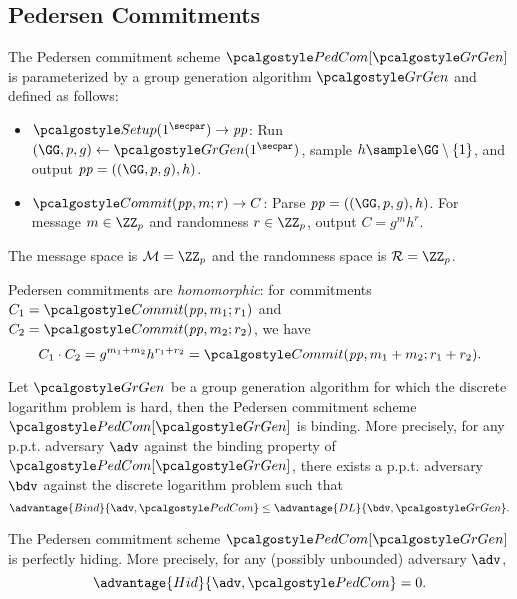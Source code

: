 \subsection{Pedersen Commitments}

\begin{definition}
  The Pedersen commitment scheme $\algo{PedCom}[\grgen]$ is parameterized by a group generation algorithm $\grgen$ and defined as follows:
  \begin{itemize}
  \item $\algo{Setup}(1^\secpar) \rightarrow \params$: Run $\gparam \gets \grgen(1^\secpar)$, sample $h \sample \GG \setminus \{1\}$, and output $\params = (\gparam, h)$.
  \item $\algo{Commit}(\params, m; r) \rightarrow C$: Parse $\params = ((\GG, p, g), h)$. For message $m \in \ZZ_p$ and randomness $r \in \ZZ_p$, output $C = g^m h^r$.
  \end{itemize}
  The message space is $\mathcal{M} = \ZZ_p$ and the randomness space is $\mathcal{R} = \ZZ_p$.
\end{definition}

\begin{remark}
  Pedersen commitments are \emph{homomorphic}: for commitments $C_1 = \algo{Commit}(\params, m_1; r_1)$ and $C_2 = \algo{Commit}(\params, m_2; r_2)$, we have
  \[
  C_1 \cdot C_2 = g^{m_1 + m_2} h^{r_1 + r_2} = \algo{Commit}(\params, m_1 + m_2; r_1 + r_2).
  \]
\end{remark}

\begin{theorem}
  Let $\grgen$ be a group generation algorithm for which the discrete logarithm problem is hard, then the Pedersen commitment scheme $\algo{PedCom}[\grgen]$ is binding.
  More precisely, for any p.p.t. adversary $\adv$ against the binding property of $\algo{PedCom}[\grgen]$, there exists a p.p.t. adversary $\bdv$ against the discrete logarithm problem such that
  \[
  \advantage{Bind}{\adv, \algo{PedCom}} \leq \advantage{DL}{\bdv, \grgen}.
  \]
\end{theorem}

\begin{theorem}
  The Pedersen commitment scheme $\algo{PedCom}[\grgen]$ is perfectly hiding.
  More precisely, for any (possibly unbounded) adversary $\adv$,
  \[
  \advantage{Hid}{\adv, \algo{PedCom}} = 0.
  \]
\end{theorem}

